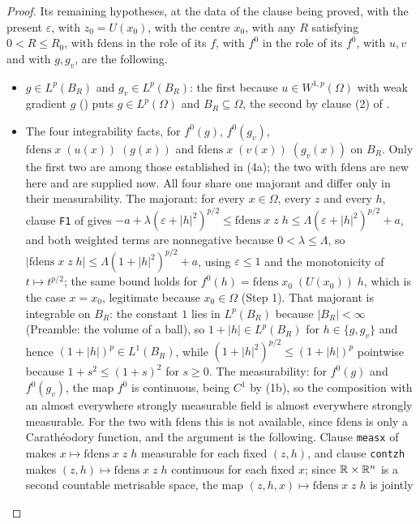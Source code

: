 \begin{proof}
Its remaining hypotheses, at the data of the clause being proved, with the
present $\varepsilon$, with $z_0=U(x_0)$, with the centre $x_0$, with any
$R$ satisfying $0<R\le R_0$, with $\mathrm{fdens}$ in the role of its $f$, with
$f^0$ in the role of its $f^0$, with $u,v$ and with $g,g_v$, are the following.
\begin{itemize}
\item $g\in L^p(B_R)$ and $g_v\in L^p(B_R)$: the first because
  $u\in W^{1,p}(\Omega)$ with weak gradient $g$ () puts
  $g\in L^p(\Omega)$ and $B_R\subseteq\Omega$, the second by clause (2) of
  .
\item The four integrability facts, for $f^0(g)$, $f^0(g_v)$,
  $\mathrm{fdens}\;x\;(u(x))\;(g(x))$ and
  $\mathrm{fdens}\;x\;(v(x))\;(g_v(x))$ on $B_R$.  Only the first two are
  among those established in (4a); the two with $\mathrm{fdens}$ are new here
  and are supplied now.  All four share one majorant and differ only in their
  measurability.  The majorant: for every $x\in\Omega$, every $z$ and every
  $h$, clause \texttt{F1} of  gives
  $-a+\lambda(\varepsilon+|h|^2)^{p/2}\le\mathrm{fdens}\;x\;z\;h\le
  \Lambda(\varepsilon+|h|^2)^{p/2}+a$, and both weighted terms are nonnegative
  because $0<\lambda\le\Lambda$, so
  $|\mathrm{fdens}\;x\;z\;h|\le\Lambda(1+|h|^2)^{p/2}+a$, using
  $\varepsilon\le1$ and the monotonicity of $t\mapsto t^{p/2}$; the same bound
  holds for $f^0(h)=\mathrm{fdens}\;x_0\;(U(x_0))\;h$, which is the case
  $x=x_0$, legitimate because $x_0\in\Omega$ (Step 1).  That majorant is
  integrable on $B_R$: the constant $1$ lies in $L^p(B_R)$ because
  $|B_R|<\infty$ (Preamble: the volume of a ball), so $1+|h|\in L^p(B_R)$ for
  $h\in\{g,g_v\}$ and hence $(1+|h|)^p\in L^1(B_R)$, while
  $(1+|h|^2)^{p/2}\le(1+|h|)^p$ pointwise because $1+s^2\le(1+s)^2$ for
  $s\ge0$.  The measurability: for $f^0(g)$ and $f^0(g_v)$, the map $f^0$ is
  continuous, being $C^1$ by (1b), so the composition with an almost
  everywhere strongly measurable field is almost everywhere strongly
  measurable.  For the two with $\mathrm{fdens}$ this is not available, since
  $\mathrm{fdens}$ is only a Carath\'eodory function, and the argument is the
  following.  Clause \texttt{measx} of 
  makes $x\mapsto\mathrm{fdens}\;x\;z\;h$ measurable for each fixed $(z,h)$,
  and clause \texttt{contzh} makes $(z,h)\mapsto\mathrm{fdens}\;x\;z\;h$
  continuous for each fixed $x$; since $\mathbb{R}\times\mathbb{R}^n$ is a second countable
  metrisable space, the map $(z,h,x)\mapsto\mathrm{fdens}\;x\;z\;h$ is jointly

\end{itemize}
\end{proof}
